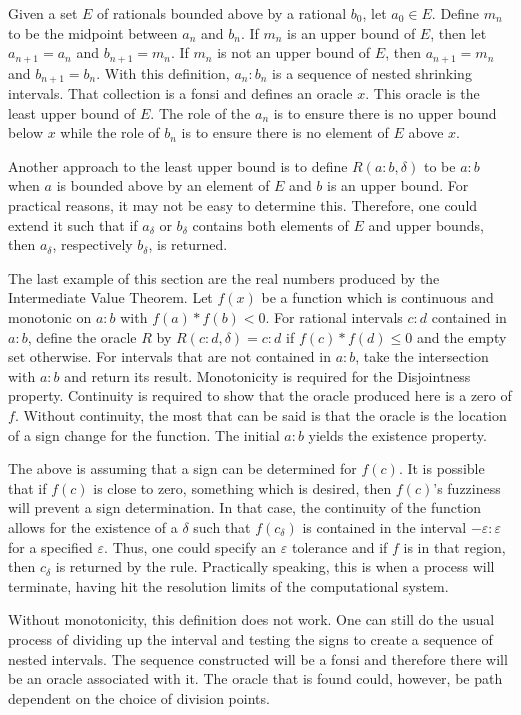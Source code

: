 \documentclass[12pt]{article}
\begin{document}
Given a set $E$ of rationals bounded above by a rational $b_0$, let $a_0 \in E$. Define $m_n$ to be the midpoint between $a_n$ and $b_n$. If $m_n$ is an upper bound of $E$, then let $a_{n+1} = a_n$ and $b_{n+1}=m_n$. If $m_n$ is not an upper bound of $E$, then $a_{n+1} = m_n$ and $b_{n+1} = b_n$. With this definition, $a_n:b_n$ is a sequence of nested shrinking intervals. That collection is a fonsi and defines an oracle $x$. This oracle is the least upper bound of $E$. The role of the $a_n$ is to ensure there is no upper bound below $x$ while the role of $b_n$ is to ensure there is no element of $E$ above $x$. 

Another approach to the least upper bound is to define $R(a:b, \delta)$ to be $a:b$ when $a$ is bounded above by an element of $E$ and $b$ is an upper bound. For practical reasons, it may not be easy to determine this. Therefore, one could extend it such that if $a_\delta$ or $b_\delta$ contains both elements of $E$ and upper bounds, then $a_\delta$, respectively $b_\delta$, is returned. 

The last example of this section are the real numbers produced by the Intermediate Value Theorem. Let $f(x)$ be a function which is continuous and monotonic on $a:b$ with $f(a)*f(b) < 0$. For rational intervals $c:d$ contained in $a:b$, define the oracle $R$ by $R(c:d, \delta) = c:d$ if $f(c)*f(d) \leq 0$ and the empty set otherwise. For intervals that are not contained in $a:b$, take the intersection with $a:b$ and return its result. Monotonicity is required for the Disjointness property. Continuity is required to show that the oracle produced here is a zero of $f$. Without continuity, the most that can be said is that the oracle is the location of a sign change for the function. The initial $a:b$ yields the existence property. 

The above is assuming that a sign can be determined for $f(c)$. It is possible that if $f(c)$ is close to zero, something which is desired, then $f(c)$'s fuzziness will prevent a sign determination. In that case, the continuity of the function allows for the existence of a $\delta$ such that $f(c_{\delta})$ is contained in the interval $-\varepsilon:\varepsilon$ for a specified $\varepsilon$. Thus, one could specify an $\varepsilon$ tolerance and if $f$ is in that region, then $c_\delta$ is returned by the rule. Practically speaking, this is when a process will terminate, having hit the resolution limits of the computational system. 

Without monotonicity, this definition does not work. One can still do the usual process of dividing up the interval and testing the signs to create a sequence of nested intervals. The sequence constructed will be a fonsi and therefore there will be an oracle associated with it. The oracle that is found could, however, be path dependent on the choice of division points. 
\end{document}
